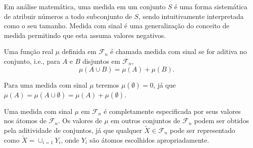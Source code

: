Em análise matemática, uma medida em um conjunto $S$ é uma forma sistemática de atribuir
números a todo subconjunto de $S$, sendo intuitivamente interpretada como o seu tamanho.
Medida com sinal é uma generalização do conceito de medida permitindo que esta assuma valores
negativos.

\begin{definition}
  Uma função real $\mu$ definida em $\mathcal{F}_n$ é chamada medida com sinal se
  for aditiva no conjunto, i.e., para $A$ e $B$ disjuntos em $\mathcal{F}_n$,
  \begin{equation}
  \mu(A \cup B) = \mu(A) + \mu(B) .
  \end{equation}
\end{definition}
Para uma medida com sinal $\mu$ teremos $\mu(\emptyset)=0$, já que
$\mu(A) = \mu(A \cup \emptyset) = \mu(A) + \mu(\emptyset)$.

Uma medida com sinal $\mu$ em $\mathcal{F}_n$ é completamente especificada
por seus valores nos átomos de $\mathcal{F}_n$. Os valores de $\mu$ em outros
conjuntos de $\mathcal{F}_n$ podem ser obtidos pela aditividade de conjuntos,
já que qualquer $\tilde{X} \in \mathcal{F}_n$ pode ser representado como
$\tilde{X} = \cup_{i=1} Y_i$, onde $Y_i$ são átomos escolhidos apropriadamente.

